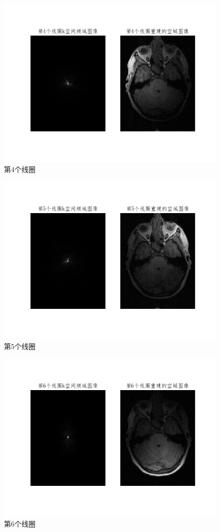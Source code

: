 \begin{figure}[H]
    \centering
    \includegraphics[width=0.6\linewidth]{fig/coil4.png}
    \caption{第4个线圈}
    \label{fig:coil4}
\end{figure}


\begin{figure}[H]
    \centering
    \includegraphics[width=0.6\linewidth]{fig/coil5.png}
    \caption{第5个线圈}
    \label{fig:coil5}
\end{figure}


\begin{figure}[H]
    \centering
    \includegraphics[width=0.6\linewidth]{fig/coil6.png}
    \caption{第6个线圈}
    \label{fig:coil6}
\end{figure}



